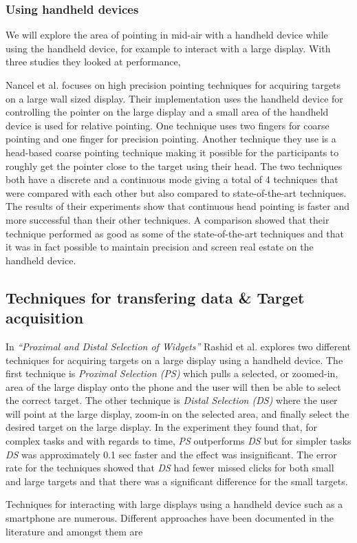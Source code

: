 \subsubsection{Using handheld devices} \label{sec:midAirPointingHandheld}
We will explore the area of pointing in mid-air with a handheld device while using the handheld device, for example to interact with a large display.
With three studies they looked at performance, 

Nancel et al. \cite{Nancel:2013} focuses on high precision pointing techniques for acquiring targets on a large wall sized display.
Their implementation uses the handheld device for controlling the pointer on the large display and a small area of the handheld device is used for relative pointing.
One technique uses two fingers for coarse pointing and one finger for precision pointing. 
Another technique they use is a head-based coarse pointing technique making it possible for the participants to roughly get the pointer close to the target using their head.
The two techniques both have a discrete and a continuous mode giving a total of 4 techniques that  were compared with each other but also compared to state-of-the-art techniques.
The results of their experiments show that continuous head pointing is faster and more successful than their other techniques.
A comparison showed that their technique performed as good as some of the state-of-the-art techniques and that it was in fact possible to maintain precision and screen real estate on the handheld device.

\subsection{Techniques for transfering data \& Target acquisition} \label{sec:targetAcquisition}
In \emph{``Proximal and Distal Selection of Widgets''} Rashid et al. \cite{Rashid:2011} explores two different techniques for acquiring targets on a large display using a handheld device.
The first technique is \emph{Proximal Selection (PS)} which pulls a selected, or zoomed-in, area of the large display onto the phone and the user will then be able to select the correct target.
The other technique is \emph{Distal Selection (DS)} where the user will point at the large display, zoom-in on the selected area, and finally select the desired target on the large display.
In the experiment they found that, for complex tasks and with regards to time, \emph{PS} outperforms \emph{DS} but for simpler tasks \emph{DS} was approximately 0.1 sec faster and the effect was insignificant.
The error rate for the techniques showed that \emph{DS} had fewer missed clicks for both small and large targets and that there was a significant difference for the small targets.

Techniques for interacting with large displays using a handheld device such as a smartphone are numerous.
Different approaches have been documented in the literature and amongst them are 
